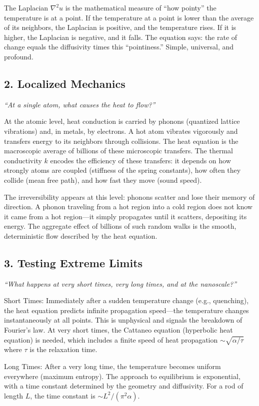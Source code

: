 \documentclass[11pt,openright]{book}
\begin{document}
The Laplacian $\nabla^2 u$ is the mathematical measure of ``how pointy'' the temperature is at a point. If the temperature at a point is lower than the average of its neighbors, the Laplacian is positive, and the temperature rises. If it is higher, the Laplacian is negative, and it falls. The equation says: the rate of change equals the diffusivity times this ``pointiness.'' Simple, universal, and profound.

\subsection*{2. Localized Mechanics}
\textit{``At a single atom, what causes the heat to flow?''}

At the atomic level, heat conduction is carried by phonons (quantized lattice vibrations) and, in metals, by electrons. A hot atom vibrates vigorously and transfers energy to its neighbors through collisions. The heat equation is the macroscopic average of billions of these microscopic transfers. The thermal conductivity $k$ encodes the efficiency of these transfers: it depends on how strongly atoms are coupled (stiffness of the spring constants), how often they collide (mean free path), and how fast they move (sound speed).

The irreversibility appears at this level: phonons scatter and lose their memory of direction. A phonon traveling from a hot region into a cold region does not know it came from a hot region---it simply propagates until it scatters, depositing its energy. The aggregate effect of billions of such random walks is the smooth, deterministic flow described by the heat equation.

\subsection*{3. Testing Extreme Limits}
\textit{``What happens at very short times, very long times, and at the nanoscale?''}

Short Times: Immediately after a sudden temperature change (e.g., quenching), the heat equation predicts infinite propagation speed---the temperature changes instantaneously at all points. This is unphysical and signals the breakdown of Fourier's law. At very short times, the Cattaneo equation (hyperbolic heat equation) is needed, which includes a finite speed of heat propagation $\sim \sqrt{\alpha/\tau}$ where $\tau$ is the relaxation time.

Long Times: After a very long time, the temperature becomes uniform everywhere (maximum entropy). The approach to equilibrium is exponential, with a time constant determined by the geometry and diffusivity. For a rod of length $L$, the time constant is $\sim L^2/(\pi^2\alpha)$.
\end{document}
